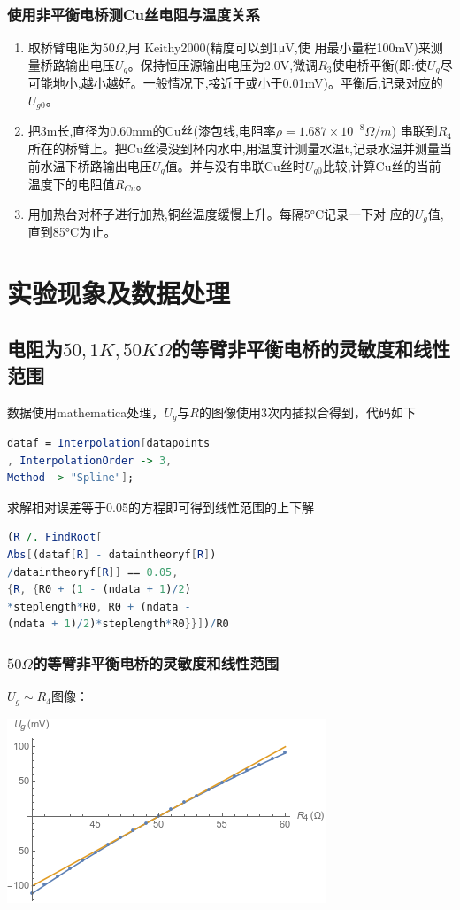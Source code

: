 \documentclass[UEF8]{ctexart}
\begin{document}
\begin{multicols}{2}
\subsubsection{使用非平衡电桥测Cu丝电阻与温度关系}
\begin{enumerate}	
	\item[1)] 取桥臂电阻为$50\Omega$,用 Keithy2000(精度可以到1μV,使
	用最小量程100mV)来测量桥路输出电压$U_{g}$。保持恒压源输出电压为2.0V,微调$R_{3}$使电桥平衡(即:使$U_{g}$尽可能地小,越小越好。一般情况下,接近于或小于0.01mV)。平衡后,记录对应的$U_{g0}$。
	\item[2)] 把3m长,直径为0.60mm的Cu丝(漆包线,电阻率$\rho=1.687\times 10^{-8}\Omega/m$)
	串联到$R_{4}$所在的桥臂上。把Cu丝浸没到杯内水中,用温度计测量水温t,记录水温并测量当前水温下桥路输出电压$U_{g}$值。并与没有串联Cu丝时$U_{g0}$比较,计算Cu丝的当前温度下的电阻值$R_{Cu}$。
	\item[3)]用加热台对杯子进行加热,铜丝温度缓慢上升。每隔5°C记录一下对
	应的$U_{g}$值,直到85°C为止。
\end{enumerate}

\section{实验现象及数据处理}
\subsection{电阻为$50,1K,50K\Omega$的等臂非平衡电桥的灵敏度和线性范围}
数据使用mathematica处理，$U_{g}$与$R$的图像使用3次内插拟合得到，代码如下
\begin{lstlisting}[language=Mathematica]
dataf = Interpolation[datapoints
, InterpolationOrder -> 3, 
Method -> "Spline"];
\end{lstlisting}

求解相对误差等于0.05的方程即可得到线性范围的上下解
\begin{lstlisting}[language=Mathematica]
(R /. FindRoot[
Abs[(dataf[R] - dataintheoryf[R])
/dataintheoryf[R]] == 0.05, 
{R, {R0 + (1 - (ndata + 1)/2)
*steplength*R0, R0 + (ndata - 
(ndata + 1)/2)*steplength*R0}}])/R0
\end{lstlisting}

\subsubsection{$50\Omega$的等臂非平衡电桥的灵敏度和线性范围}
$U_{g}\sim{R_{4}}$图像：

\includegraphics[scale=0.6]{graphs/data50.png}


\end{multicols}
\end{document}
